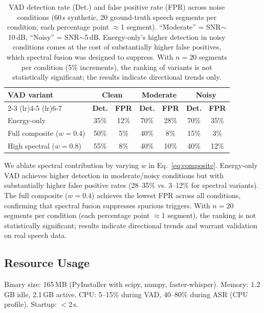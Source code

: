 \documentclass[11pt]{article}
\begin{document}
\begin{table}[t]
\centering
\small
\begin{tabular}{@{}lcccccc@{}}
\toprule
\textbf{VAD variant} & \multicolumn{2}{c}{\textbf{Clean}} & \multicolumn{2}{c}{\textbf{Moderate}} & \multicolumn{2}{c}{\textbf{Noisy}} \\
\cmidrule(lr){2-3} \cmidrule(lr){4-5} \cmidrule(lr){6-7}
 & \textbf{Det.} & \textbf{FPR} & \textbf{Det.} & \textbf{FPR} & \textbf{Det.} & \textbf{FPR} \\
\midrule
Energy-only & 35\% & 12\% & 70\% & 28\% & 70\% & 35\% \\
Full composite ($w=0.4$) & 50\% & 5\% & 40\% & 8\% & 15\% & 3\% \\
High spectral ($w=0.8$) & 55\% & 8\% & 40\% & 10\% & 40\% & 12\% \\
\bottomrule
\end{tabular}
\caption{VAD detection rate (Det.) and false positive rate (FPR) across noise conditions
(60\,s synthetic, 20 ground-truth speech segments per condition; each percentage point
$\approx$1 segment). ``Moderate'' = SNR$\sim$10\,dB, ``Noisy'' = SNR$\sim$5\,dB. Energy-only's
higher detection in noisy conditions comes at the cost of substantially higher false
positives, which spectral fusion was designed to suppress. With $n=20$ segments per
condition (5\% increments), the ranking of variants is not statistically significant; the
results indicate directional trends only.}
\label{tab:vad_ablation}
\end{table}

We ablate spectral contribution by varying $w$ in Eq.~\ref{eq:composite}. Energy-only VAD
achieves higher detection in moderate/noisy conditions but with substantially higher false
positive rates (28--35\% vs. 3--12\% for spectral variants). The full composite ($w=0.4$)
achieves the lowest FPR across all conditions, confirming that spectral fusion suppresses
spurious triggers. With $n=20$ segments per condition (each percentage point $\approx$1
segment), the ranking is not statistically significant; results indicate directional trends
and warrant validation on real speech data.

\subsection{Resource Usage}

Binary size: 165\,MB (PyInstaller with scipy, numpy, faster-whisper). Memory: 1.2\,GB
idle, 2.1\,GB active. CPU: 5--15\% during VAD, 40--80\% during ASR (CPU profile).
Startup: $<$2\,s.
\end{document}

